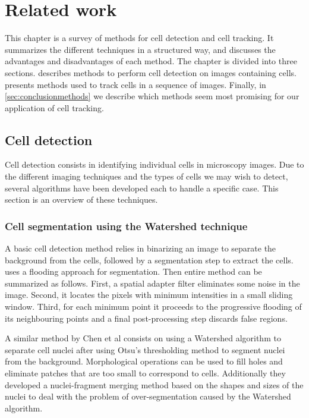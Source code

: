 \chapter{Related work \statusfirstdraft}
\label{chap:relatedwork}
This chapter is a survey of methods for cell detection and cell tracking. It summarizes the different techniques in a structured way, and discusses the advantages and disadvantages of each method. The chapter is divided into three sections.  describes methods to perform cell detection on images containing cells.  presents methods used to track cells in a sequence of images. Finally, in \cref{sec:conclusionmethods} we describe which methods seem most promising for our application of cell tracking. 
	

\section{Cell detection \statusfirstdraft}
\label{sec:detection}
\label{sec:relatedworkdetection}

Cell detection consists in identifying individual cells in microscopy images. Due to the different imaging techniques and the types of cells we may wish to detect, several algorithms have been developed each to handle a specific case. This section is an overview of these techniques.

\subsection{Cell segmentation using the Watershed technique \statusfirstdraft}

A basic cell detection method relies in binarizing an image to separate the background from the cells, followed by a segmentation step to extract the cells. \cite{chen99} uses a flooding approach for segmentation. Then entire method can be summarized as follows. First, a spatial adapter filter eliminates some noise in the image. Second, it locates the pixels with minimum intensities in a small sliding window. Third, for each minimum point it proceeds to the progressive flooding of its neighbouring points and a final post-processing step discards false regions.

A similar method by Chen et al \cite{chen06} consists on using a Watershed algorithm \cite{vincent93} to separate cell nuclei after using Otsu's thresholding method to segment nuclei from the background. Morphological operations \cite{serra83} can be used to fill holes and eliminate patches that are too small to correspond to cells. Additionally they developed a nuclei-fragment merging method based on the shapes and sizes of the nuclei to deal with the problem of over-segmentation caused by the Watershed algorithm.

